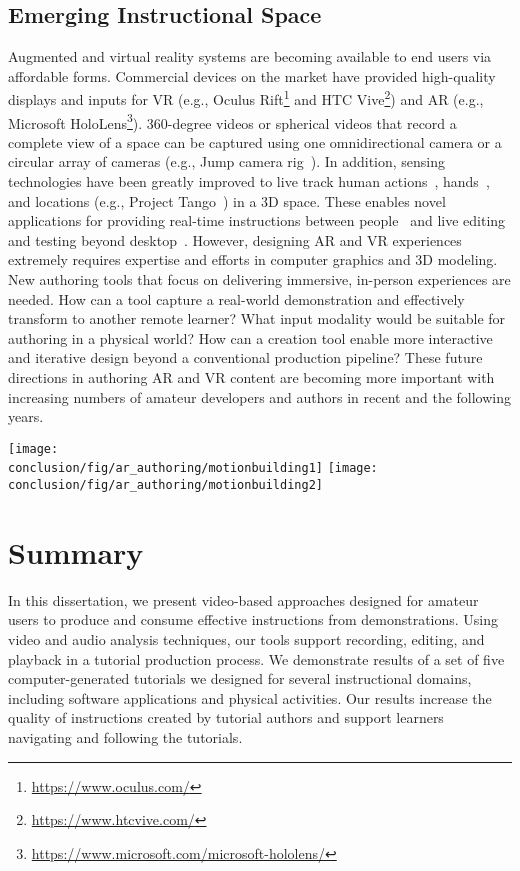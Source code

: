 \subsection{Emerging Instructional Space}
Augmented and virtual reality systems are becoming available to end users via affordable forms. Commercial devices on the market have provided high-quality displays and inputs for VR (e.g., Oculus Rift\footnote{\url{https://www.oculus.com/}} and HTC Vive\footnote{\url{https://www.htcvive.com/}}) and AR (e.g., Microsoft HoloLens\footnote{\url{https://www.microsoft.com/microsoft-hololens/}}). 360-degree videos or spherical videos that record a complete view of a space can be captured using one omnidirectional camera or a circular array of cameras (e.g., Jump camera rig~\cite{GoogleJump}).
%
In addition, sensing technologies have been greatly improved to live track human actions~\cite{dou-siggraph2016}, hands~\cite{taylor-siggraph2016}, and locations (e.g., Project Tango~\cite{GoogleTango}) in a 3D space.
%
These enables novel applications for providing real-time instructions between people~\cite{Gurevich:2012ko,MicrosoftHoloLensSkype} and live editing and testing beyond desktop~\cite{MotionBuilderAR}.
%
However, designing AR and VR experiences extremely requires expertise and efforts in computer graphics and 3D modeling. New authoring tools that focus on delivering immersive, in-person experiences are needed.
How can a tool capture a real-world demonstration and effectively transform to another remote learner? What input modality would be suitable for authoring in a physical world? How can a creation tool enable more interactive and iterative design beyond a conventional production pipeline?
%
These future directions in authoring AR and VR content are becoming more important with increasing numbers of amateur developers and authors in recent and the following years.

\begin{figure*}[ht!]
  \centering
  \texttt{[image: \\conclusion/fig/ar\_authoring/motionbuilding1]}
  \texttt{[image: \\conclusion/fig/ar\_authoring/motionbuilding2]}
\caption{
  A recent Augmented Reality (AR) application enables reviewing character animation beyond a desktop in a room-size environment~\cite{MotionBuilderAR}, licensed under CC BY 2.0.
}
\end{figure*}

\section{Summary}
In this dissertation, we present video-based approaches designed for amateur users to produce and consume effective instructions from demonstrations. Using video and audio analysis techniques, our tools support recording, editing, and playback in a tutorial production process. We demonstrate results of a set of five computer-generated tutorials we designed for several instructional domains, including software applications and physical activities. Our results increase the quality of instructions created by tutorial authors and support learners navigating and following the tutorials.
